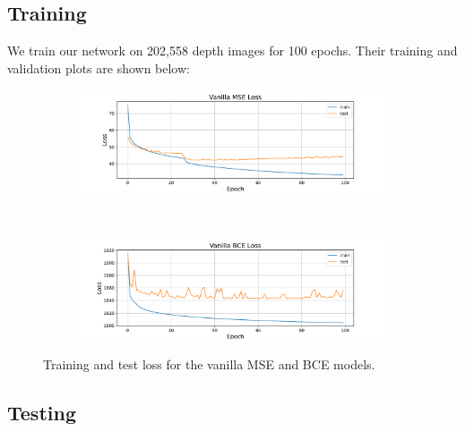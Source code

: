 \subsection{Training}
We train our network on 202,558 depth images for 100 epochs. Their training and validation plots are shown below:
\begin{figure}[htb]
    \centering
    \begin{subfigure}[b]{\textwidth}
        \centering
        \captionsetup{justification=centering}
        \includegraphics[width=0.99\textwidth]{figures/8_/1_final_MSE_plain.pdf}
        \label{fig:1_final_MSE_plain}
    \end{subfigure} \\
    \begin{subfigure}[b]{\textwidth}
        \centering
        \captionsetup{justification=centering}
        \includegraphics[width=0.99\textwidth]{figures/8_/4_final_BCE_plain.pdf}
        \label{fig:4_final_BCE_plain}
    \end{subfigure} 
    \caption{Training and test loss for the vanilla MSE and BCE models.}
    \label{fig:8_vanilla_vae}
\end{figure}

\subsection{Testing}





